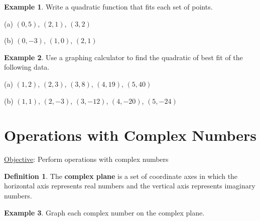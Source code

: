 \documentclass{report}
\theoremstyle{definition}
\newtheorem{example}{\bf Example}
\newtheorem{definition}{\bf Definition}[section]
\begin{document}
 \newpage




\begin{example}
Write a quadratic function that fits each set of points.
\end{example}

\begin{minipage}[t]{0.45\linewidth}
(a)  $(0,5)$, $(2,1)$, $(3,2)$


\end{minipage}
\hfill
\begin{minipage}[t]{0.45\linewidth}
(b) $(0,-3)$, $(1,0)$, $(2,1)$

\end{minipage}

\vfill

\begin{example}
Use a graphing calculator to find the quadratic of best fit of the following data.
\end{example}


\begin{minipage}[t]{0.45\linewidth}
(a)  $(1,2)$, $(2,3)$, $(3, 8)$, $(4,19)$, $(5, 40)$ 
\end{minipage}
\hfill
\begin{minipage}[t]{0.45\linewidth}
(b) $(1,1)$, $(2,-3)$, $(3,-12)$, $(4, -20)$, $(5,-24)$
\end{minipage}

\begin{minipage}[t]{0.45\linewidth}

\end{minipage}
\hfill
\begin{minipage}[t]{0.45\linewidth}

\end{minipage}

\vfill
\vfill
 \noindent{}
 \newpage

 \section{ Operations with Complex Numbers }
 \setcounter{example}{0}
 \setcounter{definition}{0}
 \hfill \underline{Objective}: Perform operations with complex numbers\\
 \begin{definition}
 The \textbf{complex plane} is a set of coordinate axes in which the horizontal axis represents real numbers and the vertical axis represents imaginary numbers.
 \end{definition}
 \begin{example}
 Graph each complex number on the complex plane. 
 \end{example}
 
\end{document}
